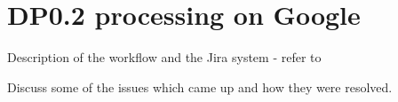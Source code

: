 \section{DP0.2 processing on Google} \label{sec:processing}

Description of the workflow and the Jira system - refer to 

Discuss some of the issues which came up and how they were resolved.
